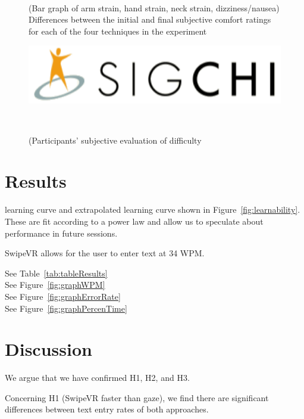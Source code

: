 \begin{figure}
\centering
{}


	\caption{(Bar graph of arm strain, hand strain, neck strain, dizziness/nausea)  Differences between the initial and final subjective comfort ratings for each of the four techniques in the experiment 
}~\label{fig:graphLearning}
\end{figure}

\begin{figure}
\centering

	\includegraphics[width=0.9\columnwidth]{figures/sigchi-logo}

	\caption{(Participants' subjective evaluation of difficulty 
}~\label{fig:graphLikert}
\end{figure}


\section{Results}

learning curve and extrapolated learning curve shown in Figure~\ref{fig:learnability}.
These are fit according to a power law and allow us to speculate about performance in future sessions.

SwipeVR allows for the user to enter text at 34 WPM.

See Table~\ref{tab:tableResults}\\
See Figure~\ref{fig:graphWPM}\\
See Figure~\ref{fig:graphErrorRate}\\
See Figure~\ref{fig:graphPercenTime}\\

\section{Discussion}
We argue that we have confirmed H1, H2, and H3.

Concerning H1 (SwipeVR faster than gaze), we find there are significant differences between text entry rates of both approaches.

